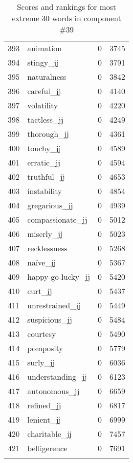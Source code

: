 \begin{longtable}[!htbp]{| rlr@{.}l |}
    393 & animation & 0 & 3745 \\
    394 & stingy\_jj & 0 & 3791 \\
    395 & naturalness & 0 & 3842 \\
    396 & careful\_jj & 0 & 4140 \\
    397 & volatility & 0 & 4220 \\
    398 & tactless\_jj & 0 & 4249 \\
    399 & thorough\_jj & 0 & 4361 \\
    400 & touchy\_jj & 0 & 4589 \\
    401 & erratic\_jj & 0 & 4594 \\
    402 & truthful\_jj & 0 & 4653 \\
    403 & instability & 0 & 4854 \\
    404 & gregarious\_jj & 0 & 4939 \\
    405 & compassionate\_jj & 0 & 5012 \\
    406 & miserly\_jj & 0 & 5023 \\
    407 & recklessness & 0 & 5268 \\
    408 & naïve\_jj & 0 & 5367 \\
    409 & happy-go-lucky\_jj & 0 & 5420 \\
    410 & curt\_jj & 0 & 5437 \\
    411 & unrestrained\_jj & 0 & 5449 \\
    412 & suspicious\_jj & 0 & 5484 \\
    413 & courtesy & 0 & 5490 \\
    414 & pomposity & 0 & 5779 \\
    415 & surly\_jj & 0 & 6036 \\
    416 & understanding\_jj & 0 & 6123 \\
    417 & autonomous\_jj & 0 & 6659 \\
    418 & refined\_jj & 0 & 6817 \\
    419 & lenient\_jj & 0 & 6999 \\
    420 & charitable\_jj & 0 & 7457 \\
    421 & belligerence & 0 & 7691 \\
    \hline
    \caption{Scores and rankings for most extreme 30 words in component \#39} \\
\end{longtable}

